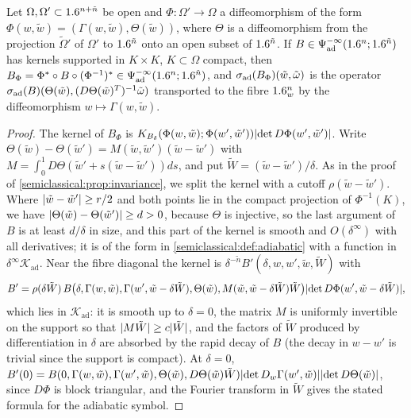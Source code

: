 \begin{lemma}\label{semiclassical:lem:adiabatic-invariance}
  Let $\Omega,\Omega'\subset1.6^{n+\tilde n}$ be open and $\Phi:\Omega'\to\Omega$ a diffeomorphism of the
  form $\Phi(w,\tilde w)=(\Gamma(w,\tilde w),\Theta(\tilde w))$, where $\Theta$ is a diffeomorphism from
  the projection $\tilde\Omega'$ of $\Omega'$ to $1.6^{\tilde n}$ onto an open subset of $1.6^{\tilde n}$. If $B\in\Psi^{-\infty}_{\mathrm{ad}}(1.6^n;1.6^{\tilde n})$ has
  kernels supported in $K\times K$, $K\subset\Omega$ compact, then
  $B_\Phi=\Phi^*\circ B\circ(\Phi^{-1})^*\in\Psi^{-\infty}_{\mathrm{ad}}(1.6^n;1.6^{\tilde n})$, and
  $\sigma_{\mathrm{ad}}(B_\Phi)(\tilde w,\tilde\omega)$ is the operator $\sigma_{\mathrm{ad}}(B)(\Theta(\tilde w),(D\Theta(\tilde w)^T)^{-1}\tilde\omega)$
  transported to the fibre $1.6^n_w$ by the diffeomorphism $w\mapsto\Gamma(w,\tilde w)$.
\end{lemma}
\begin{proof}
  The kernel of $B_\Phi$ is
  $K_{B_\delta}(\Phi(w,\tilde w);\Phi(w',\tilde w'))\lvert \det D\Phi(w',\tilde w')\rvert$. Write
  $\Theta(\tilde w)-\Theta(\tilde w')=M(\tilde w,\tilde w')(\tilde w-\tilde w')$ with
  $M=\int_0^1D\Theta(\tilde w'+s(\tilde w-\tilde w'))ds$, and put $\tilde W=(\tilde w-\tilde w')/\delta$. As in the
  proof of \cref{semiclassical:prop:invariance}, we split the kernel with a cutoff
  $\rho(\tilde w-\tilde w')$. Where $\lvert \tilde w-\tilde w'\rvert\ge r/2$ and both points lie in the
  compact projection of $\Phi^{-1}(K)$, we have
  $\lvert \Theta(\tilde w)-\Theta(\tilde w')\rvert\ge d>0$, because $\Theta$ is injective, so the last argument of $B$ is at least $d/\delta$ in
  size, and this part of the kernel is smooth and $O(\delta^\infty)$ with all
  derivatives; it is of the form in \cref{semiclassical:def:adiabatic} with a
  function in $\delta^\infty\mathcal K_{\mathrm{ad}}$. Near the fibre diagonal the kernel is
  $\delta^{-\tilde n}B'(\delta,w,w',\tilde w,\tilde W)$ with
  \begin{equation*}
    B'=\rho(\delta\tilde W)\,B\bigl(\delta,\Gamma(w,\tilde w),\Gamma(w',\tilde w-\delta\tilde W),\Theta(\tilde w),
    M(\tilde w,\tilde w-\delta\tilde W)\tilde W\bigr)\lvert \det D\Phi(w',\tilde w-\delta\tilde W)\rvert,
  \end{equation*}
  which lies in $\mathcal K_{\mathrm{ad}}$: it is smooth up to $\delta=0$, the matrix $M$ is
  uniformly invertible on the support so that $\lvert M\tilde W\rvert\ge c\lvert \tilde W\rvert$, and the factors of
  $\tilde W$ produced by differentiation in $\delta$ are absorbed by the rapid decay of $B$
  (the decay in $w-w'$ is trivial since the support is compact). At $\delta=0$,
  $B'(0)=B(0,\Gamma(w,\tilde w),\Gamma(w',\tilde w),\Theta(\tilde w),D\Theta(\tilde w)\tilde W)\lvert \det D_w\Gamma(w',\tilde w)\rvert
  \lvert \det D\Theta(\tilde w)\rvert$, since $D\Phi$ is block triangular, and the Fourier transform in
  $\tilde W$ gives the stated formula for the adiabatic symbol.
\end{proof}

